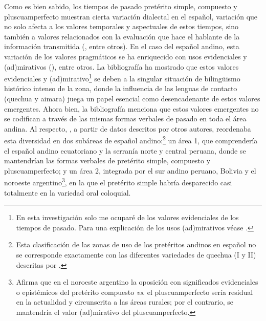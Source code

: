 \documentclass[output=paper]{../langscibook}
\begin{document}
Como es bien sabido, los tiempos de pasado pretérito simple, compuesto y pluscuamperfecto muestran cierta variación dialectal en el español, variación que no solo afecta a los valores temporales y aspectuales de estos tiempos, sino también a valores relacionados con la evaluación que hace el hablante de la información transmitida (\citealt{BentivoglioSedano1992,DeJong1999,Harris1982,Hernández2006,Hernández2013, Howe2006,Howe2009,HoweSchwenter2003,JaraYupanqui2009,JaraYupanqui2011}, entre otros). En el caso del español andino, esta variación de los valores pragmáticos se ha enriquecido con usos evidenciales y (ad)mirativos (\citealt{Blestel2015rioplatense,Bustamante1991,Calvo-Pérez2008,Escobar1997,Escobar2000,GarcíaTesoro2013,GarcíaTesoro2015,GarcíaTesoro2017,GarcíaTesoro2018,Godenzzi1986,DeGranda2001a,DeGranda2001b,Haboud1998,KleeOcampo1995,PalaciosAlcaine2007idayvuelta,Pfänder2009,PfänderPalaciosAlcaine2013,Sánchez2004,Stratford1991}), entre otros. La bibliografía ha mostrado que estos valores evidenciales y (ad)mirativo\footnote{En esta investigación solo me ocuparé de los valores evidenciales de los tiempos de pasado. Para una explicación de los usos (ad)mirativos véase    \citet{PalaciosAlcainePfänder2018}.} se deben a la singular situación de bilingüismo histórico intenso de la zona, donde la influencia de las lenguas de contacto (quechua y aimara) juega un papel esencial como desencadenante de estos valores emergentes. Ahora bien, la bibliografía menciona que estos valores emergentes no se codifican a través de las mismas formas verbales de pasado en toda el área andina. Al respecto, \citet{DeGranda2001b}, a partir de datos descritos por otros autores, reordenaba esta diversidad en dos subáreas de español andino:\footnote{Esta clasificación de las zonas de uso de los pretéritos andinos en español no se corresponde exactamente con las diferentes variedades de quechua (I y II) descritas por \citet{Torero1964}.} un área 1, que comprendería el español andino ecuatoriano y la serranía norte y central peruana, donde se mantendrían las formas verbales de pretérito simple, compuesto y pluscuamperfecto; y un área 2, integrada por el sur andino peruano, Bolivia y el noroeste argentino\footnote{Afirma \citet{DeGranda2001b} que en el noroeste argentino la oposición con significados evidenciales o epistémicos del pretérito compuesto \textit{vs}. el pluscuamperfecto sería residual en la actualidad y circunscrita a las áreas rurales; por el contrario, se mantendría el valor (ad)mirativo del pluscuamperfecto.}, en la que el pretérito simple habría desparecido casi totalmente en la variedad oral coloquial.
\end{document}
